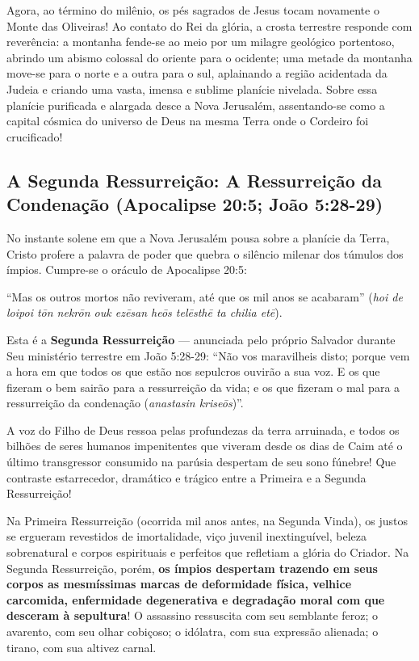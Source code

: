 \documentclass[11pt,a4paper,openany]{book}
\begin{document}
Agora, ao término do milênio, os pés sagrados de Jesus tocam novamente o Monte das Oliveiras!
Ao contato do Rei da glória, a crosta terrestre responde com reverência: a montanha fende-se ao meio por um milagre geológico portentoso, abrindo um abismo colossal do oriente para o ocidente; uma metade da montanha move-se para o norte e a outra para o sul, aplainando a região acidentada da Judeia e criando uma vasta, imensa e sublime planície nivelada.
Sobre essa planície purificada e alargada desce a Nova Jerusalém, assentando-se como a capital cósmica do universo de Deus na mesma Terra onde o Cordeiro foi crucificado!



\subsection{A Segunda Ressurreição: A Ressurreição da Condenação (Apocalipse 20:5; João 5:28-29)}


No instante solene em que a Nova Jerusalém pousa sobre a planície da Terra, Cristo profere a palavra de poder que quebra o silêncio milenar dos túmulos dos ímpios. Cumpre-se o oráculo de Apocalipse 20:5:

``Mas os outros mortos não reviveram, até que os mil anos se acabaram'' (\textit{hoi de loipoi tōn nekrōn ouk ezēsan heōs telēsthē ta chilia etē}).

Esta é a \textbf{Segunda Ressurreição} — anunciada pelo próprio Salvador durante Seu ministério terrestre em João 5:28-29:
``Não vos maravilheis disto; porque vem a hora em que todos os que estão nos sepulcros ouvirão a sua voz. E os que fizeram o bem sairão para a ressurreição da vida; e os que fizeram o mal para a ressurreição da condenação (\textit{anastasin kriseōs})''.

A voz do Filho de Deus ressoa pelas profundezas da terra arruinada, e todos os bilhões de seres humanos impenitentes que viveram desde os dias de Caim até o último transgressor consumido na parúsia despertam de seu sono fúnebre!
Que contraste estarrecedor, dramático e trágico entre a Primeira e a Segunda Ressurreição!

Na Primeira Ressurreição (ocorrida mil anos antes, na Segunda Vinda), os justos se ergueram revestidos de imortalidade, viço juvenil inextinguível, beleza sobrenatural e corpos espirituais e perfeitos que refletiam a glória do Criador.
Na Segunda Ressurreição, porém, \textbf{os ímpios despertam trazendo em seus corpos as mesmíssimas marcas de deformidade física, velhice carcomida, enfermidade degenerativa e degradação moral com que desceram à sepultura}! O assassino ressuscita com seu semblante feroz; o avarento, com seu olhar cobiçoso; o idólatra, com sua expressão alienada; o tirano, com sua altivez carnal.
\end{document}
